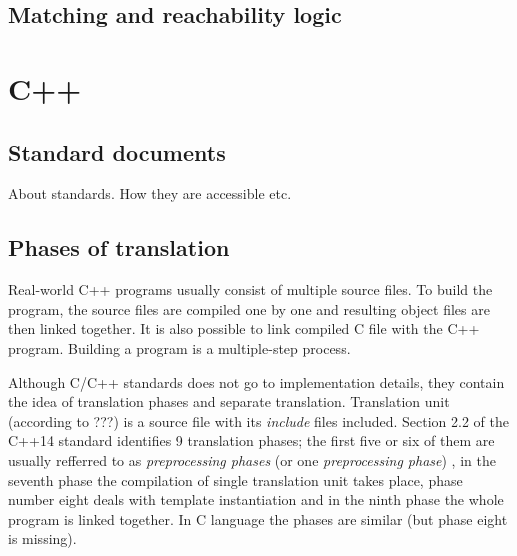 \documentclass{fithesis3}
\begin{document}
\subsection{Matching and reachability logic}


\section{C++}



\subsection{Standard documents}

About standards. How they are accessible etc.

\subsection{Phases of translation}
\label{txt:phases-of-translation}
Real-world C++ programs usually consist of multiple source files. To build the program, the source files are compiled one by one and resulting object files are then linked together. It is also possible to link compiled C file with the C++ program. Building a program is a multiple-step process.


Although C/C++ standards does not go to implementation details, they contain the idea of translation phases and separate translation. Translation unit (according to ???) is a source file with its \textit{include} files included. Section 2.2 of the C++14 standard identifies 9 translation phases; the first five or six of them are usually refferred to as \textit{preprocessing phases} (or one \textit{preprocessing phase}) , in the seventh phase the compilation of single translation unit takes place, phase number eight deals with template instantiation and in the ninth phase the whole program is linked together. In C language the phases are similar (but phase eight is missing).
\end{document}
